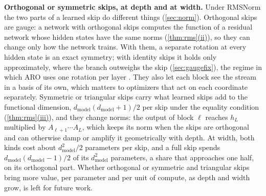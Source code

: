 \documentclass[10pt]{article}
\theoremstyle{definition}
\theoremstyle{remark}
\newcommand{\dm}{d_{\mathrm{model}}}
\newcommand{\para}[1]{\smallskip\noindent\textbf{#1}\hspace{0.5em}}
\DeclareRobustCommand{\cpref}[2]{\hyperref[#1:#2]{\cref*{#1}(#2)}}
\begin{document}
\para{Orthogonal or symmetric skips, at depth and at width.} Under RMSNorm the two parts of a learned skip do different things (\cref{sec:norm}). Orthogonal skips are gauge: a network with orthogonal skips computes the function of a residual network whose hidden states have the same norms (\cpref{thm:rms}{ii}), so they can change only how the network trains. With them, a separate rotation at every hidden state is an exact symmetry; with identity skips it holds only approximately, where the branch outweighs the skip (\cref{sec:gaugefix}), the regime in which ARO uses one rotation per layer \citep[Section~6.4]{gong2026aro}. They also let each block see the stream in a basis of its own, which matters to optimizers that act on each coordinate separately. Symmetric or triangular skips carry what learned skips add to the functional dimension, $\dm(\dm+1)/2$ per skip under the equality condition (\cpref{thm:rms}{iii}), and they change norms: the output of block $\ell$ reaches $h_L$ multiplied by $A_{\ell+1}\cdots A_L$, which keeps its norm when the skips are orthogonal and can otherwise damp or amplify it geometrically with depth. At width, both kinds cost about $\dm^2/2$ parameters per skip, and a full skip spends $\dm(\dm-1)/2$ of its $\dm^2$ parameters, a share that approaches one half, on its orthogonal part. Whether orthogonal or symmetric and triangular skips bring more value, per parameter and per unit of compute, as depth and width grow, is left for future work.
\end{document}
